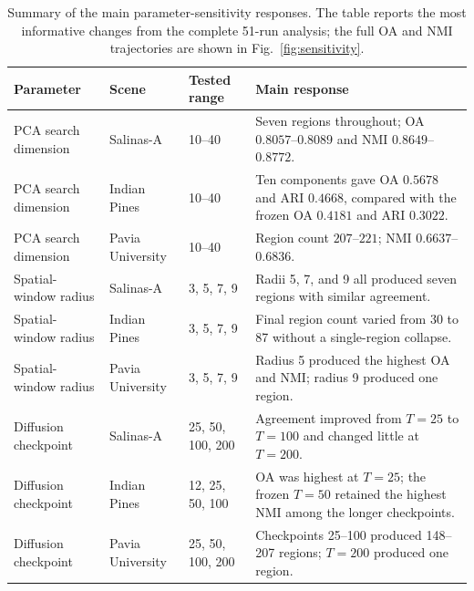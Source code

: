 \documentclass[10pt,a4paper,fleqn]{article}
\begin{document}
\begin{table}[!t]
\centering
\footnotesize
\caption{Summary of the main parameter-sensitivity responses. The table
reports the most informative changes from the complete 51-run analysis;
the full OA and NMI trajectories are shown in
Fig.~\ref{fig:sensitivity}.}
\label{tab:sensitivity_summary}

\renewcommand{\arraystretch}{1.06}
\setlength{\tabcolsep}{4pt}

\begin{tabularx}{\textwidth}{@{}p{}
p{}
p{}
X@{}}
\toprule
Parameter & Scene & Tested range & Main response \\
\midrule

PCA search dimension
& Salinas-A
& 10--40
& Seven regions throughout; OA \(0.8057\)--\(0.8089\) and
NMI \(0.8649\)--\(0.8772\). \\

PCA search dimension
& Indian Pines
& 10--40
& Ten components gave OA \(0.5678\) and ARI \(0.4668\), compared with
the frozen OA \(0.4181\) and ARI \(0.3022\). \\

PCA search dimension
& Pavia University
& 10--40
& Region count \(207\)--\(221\); NMI \(0.6637\)--\(0.6836\). \\

Spatial-window radius
& Salinas-A
& 3, 5, 7, 9
& Radii 5, 7, and 9 all produced seven regions with similar agreement. \\

Spatial-window radius
& Indian Pines
& 3, 5, 7, 9
& Final region count varied from 30 to 87 without a single-region collapse. \\

Spatial-window radius
& Pavia University
& 3, 5, 7, 9
& Radius 5 produced the highest OA and NMI; radius 9 produced one region. \\

Diffusion checkpoint
& Salinas-A
& 25, 50, 100, 200
& Agreement improved from \(T=25\) to \(T=100\) and changed little at
\(T=200\). \\

Diffusion checkpoint
& Indian Pines
& 12, 25, 50, 100
& OA was highest at \(T=25\); the frozen \(T=50\) retained the highest
NMI among the longer checkpoints. \\

Diffusion checkpoint
& Pavia University
& 25, 50, 100, 200
& Checkpoints 25--100 produced 148--207 regions; \(T=200\) produced one
region. \\


\end{tabularx}
\end{table}
\end{document}
